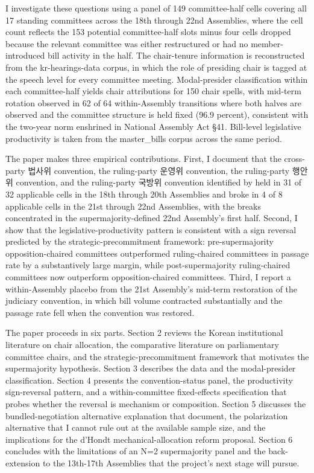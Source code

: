 \documentclass[11pt]{article}
\begin{document}
I investigate these questions using a panel of 149 committee-half cells covering all 17 standing committees across the 18th through 22nd Assemblies, where the cell count reflects the 153 potential committee-half slots minus four cells dropped because the relevant committee was either restructured or had no member-introduced bill activity in the half. The chair-tenure information is reconstructed from the kr-hearings-data corpus, in which the role of presiding chair is tagged at the speech level for every committee meeting. Modal-presider classification within each committee-half yields chair attributions for 150 chair spells, with mid-term rotation observed in 62 of 64 within-Assembly transitions where both halves are observed and the committee structure is held fixed (96.9 percent), consistent with the two-year norm enshrined in National Assembly Act §41. Bill-level legislative productivity is taken from the master\_bills corpus across the same period.

The paper makes three empirical contributions. First, I document that the cross-party 법사위 convention, the ruling-party 운영위 convention, the ruling-party 행안위 convention, and the ruling-party 국방위 convention identified by \citet{jung2018} held in 31 of 32 applicable cells in the 18th through 20th Assemblies and broke in 4 of 8 applicable cells in the 21st through 22nd Assemblies, with the breaks concentrated in the supermajority-defined 22nd Assembly's first half. Second, I show that the legislative-productivity pattern is consistent with a sign reversal predicted by the strategic-precommitment framework: pre-supermajority opposition-chaired committees outperformed ruling-chaired committees in passage rate by a substantively large margin, while post-supermajority ruling-chaired committees now outperform opposition-chaired committees. Third, I report a within-Assembly placebo from the 21st Assembly's mid-term restoration of the judiciary convention, in which bill volume contracted substantially and the passage rate fell when the convention was restored.

The paper proceeds in six parts. Section 2 reviews the Korean institutional literature on chair allocation, the comparative literature on parliamentary committee chairs, and the strategic-precommitment framework that motivates the supermajority hypothesis. Section 3 describes the data and the modal-presider classification. Section 4 presents the convention-status panel, the productivity sign-reversal pattern, and a within-committee fixed-effects specification that probes whether the reversal is mechanism or composition. Section 5 discusses the bundled-negotiation alternative explanation that \citet{leekim2022} document, the polarization alternative that I cannot rule out at the available sample size, and the implications for the d'Hondt mechanical-allocation reform proposal. Section 6 concludes with the limitations of an N=2 supermajority panel and the back-extension to the 13th-17th Assemblies that the project's next stage will pursue.
\end{document}
